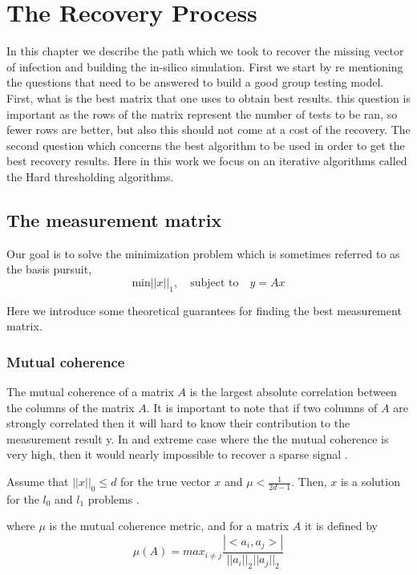 \chapter{The Recovery Process}  
%
In this chapter we describe the path which we took to recover the missing vector of infection and  building the in-silico simulation. First we start by re mentioning the questions that need to be answered to build a good group testing model. First, what is the best matrix that one uses to obtain best results. this question is important as the rows of the matrix represent the number of tests to be ran, so fewer rows are better, but also this should not come at a cost of the recovery. The second question which concerns the best algorithm to be used in order to get the best recovery results. Here in this work we focus on an iterative algorithms called the Hard thresholding algorithms. %
\section{The measurement matrix}
\label{label1}
Our goal is to solve the minimization problem which is sometimes referred to as the basis pursuit,   \begin{equation}\label{BP}
\text{min}  ||x||_1, \quad\text{subject to}\quad y = Ax 
\end{equation}   	

Here we introduce some theoretical guarantees for finding the best measurement matrix.  

\subsection{Mutual coherence}
The mutual coherence of a matrix $ A $ is the largest absolute correlation between the columns of the matrix $ A $. It is important to note that if two columns of $ A $ are strongly correlated then it will hard to know their contribution to the measurement result y. In and extreme case where the the mutual coherence is very high, then it would nearly impossible to recover  a sparse signal \cite{radar}. 
\begin{theorem}
	Assume that $ ||x||_0 \leq d $ for the true vector $ x $ and $ \mu  < \frac{1}{2d-1}$. Then, $ x $ is a solution for the $ l_0 $ and $ l_1 $ problems . 
\end{theorem} 
where $ \mu $ is the mutual coherence metric, and for a matrix $ A $ it is defined by \cite{radar}  \begin{equation}\label{key}
\mu(A) = max_{i\neq j} \frac{|<a_i,a_j>|}{||a_i||_2 ||a_j||_2}
\end{equation} 


